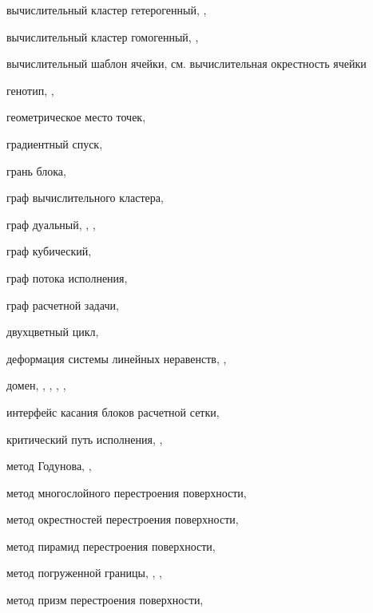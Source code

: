 вычислительный кластер гетерогенный, \pageref{term:cluster_getero}, \pageref{term:cluster_getero2}

вычислительный кластер гомогенный, \pageref{term:cluster_gomo}, \pageref{term:cluster_gomo2}

вычислительный шаблон ячейки, см. вычислительная окрестность ячейки

генотип, \pageref{term:genotype}, \pageref{term:genotype2}

геометрическое место точек, \pageref{term:gmt}

градиентный спуск, \pageref{term:gradient_spusk}

грань блока, \pageref{term:block_facet}

граф вычислительного кластера, \pageref{term:graph_cluster}

граф дуальный, \pageref{term:dual_graph}, \pageref{term:dual_graph2}, \pageref{term:dual_graph3}

граф кубический, \pageref{term:graph_cubic}

граф потока исполнения, \pageref{term:graph_cfg}

граф расчетной задачи, \pageref{term:graph_task}

двухцветный цикл, \pageref{term:bicolor_cycle}

деформация системы линейных неравенств, \pageref{term:deform_sys_lin_neravenstv}, \pageref{term:deform_sys_lin_neravenstv2}

домен, \pageref{term:domain}, \pageref{term:domain2}, \pageref{term:domain3}, \pageref{term:domain4}, \pageref{term:domain5}

интерфейс касания блоков расчетной сетки, \pageref{term:block_interface}

критический путь исполнения, \pageref{term:critical_path}, \pageref{term:critical_path2}

метод Годунова, \pageref{term:godunov_method}, \pageref{term:godunov_method2}

метод многослойного перестроения поверхности, \pageref{term:method_remesh_multi}

метод окрестностей перестроения поверхности, \pageref{term:method_remesh_okr}

метод пирамид перестроения поверхности, \pageref{term:method_remesh_pyramid}

метод погруженной границы, \pageref{term:immersed_boundary_method}, \pageref{term:immersed_boundary_method2}, \pageref{term:immersed_boundary_method3}

метод призм перестроения поверхности, \pageref{term:method_remesh_prism}

